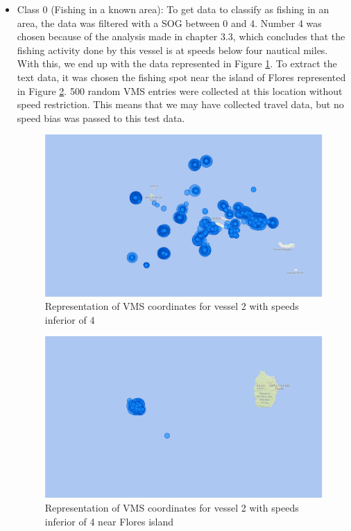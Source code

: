 \begin{itemize}
\item Class 0 (Fishing in a known area): To get data to classify as fishing in an area, the data was filtered with a SOG between 0 and 4. Number 4 was chosen because of the analysis made in chapter 3.3, which concludes that the fishing activity done by this vessel is at speeds below four nautical miles. With this, we end up with the data represented in Figure \ref{fig:bi_2_all}. To extract the text data, it was chosen the fishing spot near the island of Flores represented in Figure \ref{fig:bi_2_flores}. 500 random VMS entries were collected at this location without speed restriction. This means that we may have collected travel data, but no speed bias was passed to this test data. 


\begin{figure}[H]
\centering
\includegraphics[width=0.8\linewidth]{Chapters/img/2fishingAll.pdf}
\caption{Representation of VMS coordinates for vessel 2 with speeds inferior of 4 }
\label{fig:bi_2_all}
\end{figure}

\begin{figure}[H]
\centering
\includegraphics[width=0.8\linewidth]{Chapters/img/2fishing.pdf}
\caption{Representation of VMS coordinates for vessel 2 with speeds inferior of 4 near Flores island }
\label{fig:bi_2_flores}
\end{figure}


\end{itemize}
